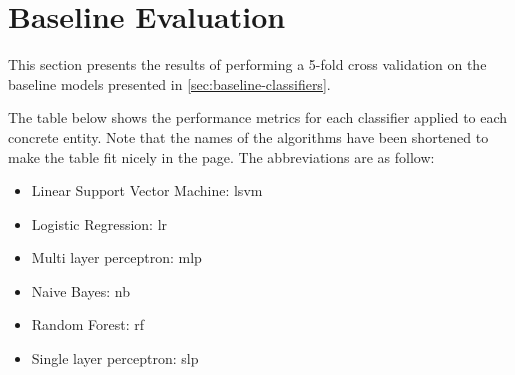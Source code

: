 \documentclass[epsfig,a4paper,11pt,titlepage,twoside,openany]{book}
\begin{document}
\section{Baseline Evaluation}
\label{sec:baseline-evaluation}

This section presents the results of performing a 5-fold cross validation on the baseline models presented in \autoref{sec:baseline-classifiers}. 

The table below shows the performance metrics for each classifier applied to each concrete entity. Note that the names of the algorithms have been shortened to make the table fit nicely in the page. The abbreviations are as follow:

\begin{itemize}
    \item Linear Support Vector Machine: lsvm
    \item Logistic Regression: lr
    \item Multi layer perceptron: mlp
    \item Naive Bayes: nb
    \item Random Forest: rf
    \item Single layer perceptron: slp
\end{itemize}
\end{document}
